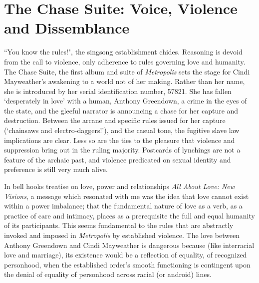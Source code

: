 \documentclass[a4paper, 11pt]{article} %
\begin{document}

\section*{The Chase Suite: Voice, Violence and Dissemblance}

``You know the rules!"\cite{wolfmasters}, the singsong establishment chides.
Reasoning is devoid from the call to violence, only adherence to rules governing love and humanity.
The Chase Suite, the first album and suite of \emph{Metropolis} sets the stage for Cindi Mayweather's awakening to a world not of her making.
Rather than her name, she is introduced by her serial identification number, 57821.
She has fallen `desperately in love' with a human, Anthony Greendown, a crime in the eyes of the state, and the gleeful narrator is announcing a chase for her capture and destruction.
Between the arcane and specific rules issued for her capture (`chainsaws and electro-daggers!'\cite{wolfmasters}), and the casual tone, the fugitive slave law implications are clear.
Less so are the ties to the pleasure that violence and suppression bring out in the ruling majority.
Postcards of lynchings are not a feature of the archaic past, and violence predicated on sexual identity and preference is still very much alive.

In bell hooks treatise on love, power and relationships \emph{All About Love: New Visions}, a message which resonated with me was the idea that love cannot exist within a power imbalance; that the fundamental nature of love as a verb, as a practice of care and intimacy, places as a prerequisite the full and equal humanity of its participants\cite{newvisions}. 
This seems fundamental to the rules that are abstractly invoked and imposed in \emph{Metropolis} by established violence. 
The love between Anthony Greendown and Cindi Mayweather is dangerous because (like interracial love and marriage), its existence would be a reflection of equality, of recognized personhood, when the established order's smooth functioning is contingent upon the denial of equality of personhood across racial (or android) lines. 
\end{document}
